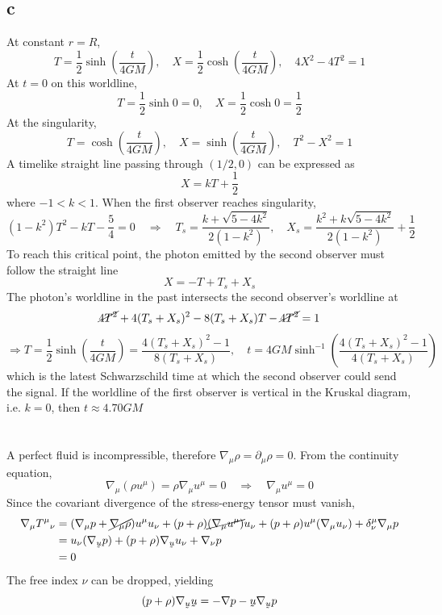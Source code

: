 \documentclass{article}
\newcommand{\ut}[1]{\underaccent{\tilde}{#1}}
\begin{document}
\subsection*{c}
At constant $r = R$,
\[  T = \frac{1}{2}\sinh\left( \frac{t}{4GM} \right), \quad X = \frac{1}{2}\cosh\left( \frac{t}{4GM} \right)
	,\quad 4X^2 - 4T^2 = 1 \]
At $t = 0$ on this worldline,
\[ T = \frac{1}{2}\sinh0 = 0, \quad X = \frac{1}{2}\cosh0 = \frac{1}{2} \]
At the singularity,
\[ T = \cosh\left( \frac{t}{4GM} \right),\quad X = \sinh\left( \frac{t}{4GM} \right), \quad T^2 - X^2 = 1 \]
A timelike straight line passing through $(1/2, 0)$ can be expressed as 
\[ X = kT + \frac{1}{2}\]
where $-1 < k< 1$. When the first observer reaches singularity,
\[ (1- k^2)T^2 - kT - \frac{5}{4} = 0 \quad\Rightarrow\quad \boxed{T_s = \frac{k + \sqrt{5-4k^2}}{2(1-k^2)},\quad
	X_s = \frac{k^2 + k\sqrt{5-4k^2}}{2(1-k^2)} + \frac{1}{2}}\]
To reach this critical point, the photon emitted by the second observer must follow the straight line
\[ X  = - T + T_s + X_s \]
The photon's worldline in the past intersects the second observer's worldline at
\[ \cancel{4T^2} + 4(T_s + X_s)^2 -8(T_s+X_s)T - \cancel{4T^2} = 1\]
\[ \Rightarrow T = \frac{1}{2}\sinh\left( \frac{t}{4GM} \right)  = \frac{4(T_s+X_s)^2 - 1}{8(T_s + X_s)}
	,\quad \boxed{t = 4GM\sinh^{-1}\left(\frac{4(T_s+X_s)^2 - 1}{4(T_s + X_s)}\right)} \]
which is the latest Schwarzschild time at which the second observer could send the signal. If the worldline of the first observer is vertical in the Kruskal diagram, i.e. $k=0$, then $t \approx 4.70GM$
\section{}
A perfect fluid is incompressible, therefore $\nabla_\mu \rho = \partial_\mu \rho = 0$. From the continuity equation,
\[ \nabla_\mu(\rho u^\mu) =  \rho \nabla_\mu u^\mu = 0 \quad\Rightarrow\quad \nabla_\mu u^\mu = 0\]
Since the covariant divergence of the stress-energy tensor must vanish,
\begin{align*}
\nabla_\mu T^\mu{}_\nu &= (\nabla_\mu p + \cancel{\nabla_\mu\rho}) u^\mu u_\nu + (p+\rho) \cancel{(\nabla_\mu u^\mu)} u_\nu + (p+\rho) u^\mu (\nabla_\mu u_\nu) + \delta^\mu_\nu \nabla_\mu p \\
&=  u_\nu (\nabla_{\ut{u}} p)  + (p+\rho) \nabla_{\ut{u}} u_\nu + \nabla_\nu p \\
&= 0
\end{align*}
The free index $\nu$ can be dropped, yielding
\[ (p + \rho)\nabla_{\ut{u}}\ut{u} = - \nabla p - \ut{u}\nabla_{\ut{u}}p \]
\end{document}
